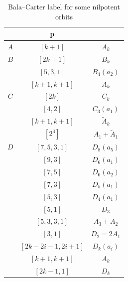 \documentclass[reqno,12pt]{amsart}
\numberwithin{equation}{section}
\theoremstyle{plain}
\theoremstyle{definition}
\begin{document}
\begin{table}[htbp]\caption{ Bala--Carter label for some nilpotent orbits }
	\label{label}
	\centering
	\renewcommand{\arraystretch}{1.5}
	\setlength\tabcolsep{5pt}
	
		\begin{tabular}{|c|c|c|}
		\hline \text{Type}  &${\bf p}$ & \text{Bala--Carter label} \\ \hline
        $A$ & $[k+1]$ & $A_k$ \\
        \hline

        $B$ & $[2k+1]$ & $B_k$ \\
        &$[5,3,1]$ & $B_4(a_2)$\\
        & $[k+1,k+1]$ & $A_k$ \\
        \hline
$C$ & $[2k]$ & $C_k$ \\
& $[4,2]$ & $C_3(a_1)$ \\
        & $[k+1,k+1]$ & $\tilde{A}_k$ \\
        & $[2^3]$ & $A_1+\tilde{A}_1$\\
        \hline
     

      $D$  &  $ [7,5, 3, 1] $  &   $ D_8(a_5)$      \\ 

        &   $ [9, 3] $  &  $D_6(a_1)$      \\
         
       &   $ [7, 5] $  &  $D_6(a_2)$      \\
         
       &   $ [7, 3] $  &  $D_5(a_1)$      \\
         
       &   $ [5, 3] $  &  $D_4(a_1)$      \\
          
        &  $ [5, 1] $  &  $D_3$      \\
         &  $ [5,3,3, 1] $  &  $A_3+A_2$      \\ 


         
       &   $ [3, 1] $  &  $D_2=2A_1$      \\
      &   $ [2k-2i-1, 2i+1] $  &  $D_k(a_i)$      \\
        
        
        
        &$[k+1,k+1]$ & $A_k$ \\
        &$[2k-1,1]$ & $D_k$ \\
        
        
        
        
        
        \hline

    
 
 
 \end{tabular}
	\bigskip
	
\end{table}
\end{document}
